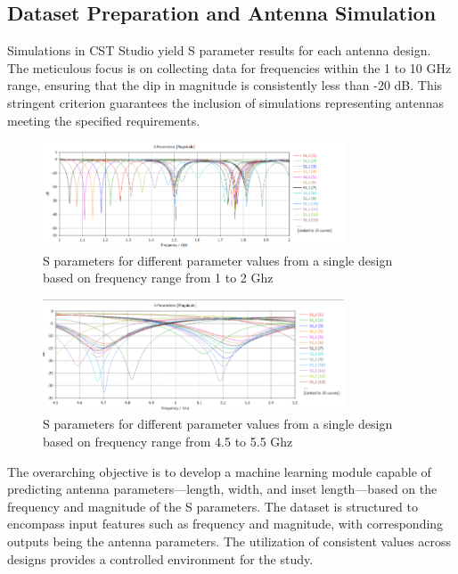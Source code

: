\documentclass[a4paper,12pt]{report}
\begin{document}
\subsection{Dataset Preparation and Antenna Simulation}

Simulations in CST Studio yield S parameter results for each antenna design. The meticulous focus is on collecting data for frequencies within the 1 to 10 GHz range, ensuring that the dip in magnitude is consistently less than -20 dB. This stringent criterion guarantees the inclusion of simulations representing antennas meeting the specified requirements.

\begin{figure}[H]
    \centering
    \includegraphics[width=0.8\textwidth]{s1to2.png}
    \caption{S parameters for different parameter values from a single design based on frequency range from 1 to 2 Ghz}
    \label{fig:s1to2}
\end{figure}

\begin{figure}[H]
    \centering
    \includegraphics[width=0.8\textwidth]{s4to5.png}
    \caption{S parameters for different parameter values from a single design based on frequency range from 4.5 to 5.5 Ghz}
    \label{fig:s4to5}
\end{figure}




The overarching objective is to develop a machine learning module capable of predicting antenna parameters—length, width, and inset length—based on the frequency and magnitude of the S parameters. The dataset is structured to encompass input features such as frequency and magnitude, with corresponding outputs being the antenna parameters. The utilization of consistent values across designs provides a controlled environment for the study.
\end{document}
